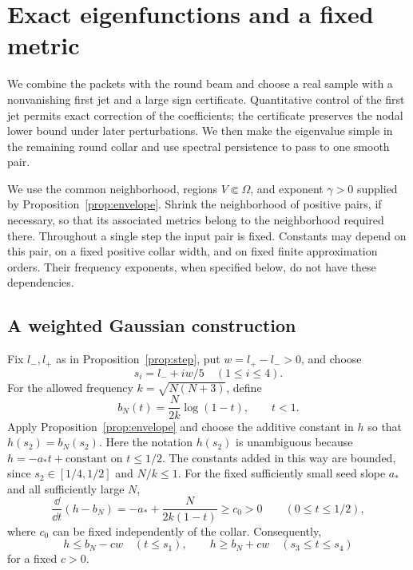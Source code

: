 \section{Exact eigenfunctions and a fixed metric}\label{sec:global}

We combine the packets with the round beam and choose a real sample
with a nonvanishing first jet and a large sign certificate.
Quantitative control of the first jet permits exact correction of the
coefficients; the certificate preserves the nodal lower bound under later
perturbations. We then make the eigenvalue simple in the remaining
round collar and use spectral persistence to pass to one smooth pair.

We use the common neighborhood, regions $V\Subset\Omega$, and exponent
$\gamma>0$ supplied by Proposition~\ref{prop:envelope}. Shrink the
neighborhood of positive pairs, if necessary, so that its associated
metrics belong to the neighborhood required there. Throughout a single
step the input pair is fixed. Constants may depend on this pair, on a
fixed positive collar width, and on fixed finite approximation orders.
Their frequency exponents, when specified below, do not have these
dependencies.

\subsection{A weighted Gaussian construction}

Fix $l_-,l_+$ as in Proposition~\ref{prop:step}, put $w=l_+-l_->0$,
and choose
\[
 s_i=l_-+iw/5\quad(1\le i\le4).
\]
For the allowed frequency $k=\sqrt{N(N+3)}$, define
\[
 b_N(t)=\frac{N}{2k}\log(1-t),\qquad t<1.
\]
Apply Proposition~\ref{prop:envelope} and choose the additive constant
in $h$ so that $h(s_2)=b_N(s_2)$. Here the notation $h(s_2)$ is
unambiguous because $h=-a_*t+\text{constant}$ on $t\le1/2$.
The constants added in this way are bounded, since
$s_2\in[1/4,1/2]$ and $N/k\le1$. For the fixed sufficiently small
seed slope $a_*$ and all sufficiently large $N$,
\[
 \frac{\dd}{\dd t}(h-b_N)
 =-a_*+\frac{N}{2k(1-t)}\ge c_0>0
 \qquad(0\le t\le1/2),
\]
where $c_0$ can be fixed independently of the collar. Consequently,
\begin{equation}\label{eq:gluing-gaps}
 h\le b_N-cw\quad(t\le s_1),\qquad
 h\ge b_N+cw\quad(s_3\le t\le s_4)
\end{equation}
for a fixed $c>0$.

